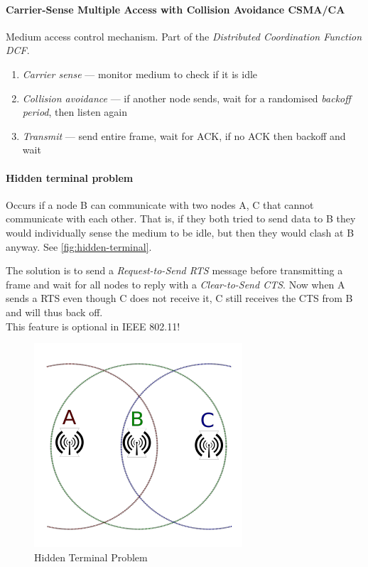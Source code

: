 \paragraph{Carrier-Sense Multiple Access with Collision Avoidance CSMA/CA}
Medium access control mechanism.
Part of the \textit{Distributed Coordination Function DCF}.
\begin{enumerate}
	\item \textit{Carrier sense} --- monitor medium to check if it is idle
	\item \textit{Collision avoidance} --- if another node sends, wait for a randomised \textit{backoff period}, then listen again
	\item \textit{Transmit} --- send entire frame, wait for ACK, if no ACK then backoff and wait
\end{enumerate}

\paragraph{Hidden terminal problem}
Occurs if a node B can communicate with two nodes A, C that cannot communicate with each other.
That is, if they both tried to send data to B they would individually sense the medium to be idle, but then they would clash at B anyway.
See \autoref{fig:hidden-terminal}.

The solution is to send a \textit{Request-to-Send RTS} message before transmitting a frame and wait for all nodes to reply with a \textit{Clear-to-Send CTS}.
Now when A sends a RTS even though C does not receive it, C still receives the CTS from B and will thus back off.
\\
This feature is optional in IEEE 802.11!

\begin{figure}[h]
	\centering
	\includegraphics[scale=0.6]{images/9-hidden-terminal.png}
	\caption{Hidden Terminal Problem}%
	\label{fig:hidden-terminal}
\end{figure}

